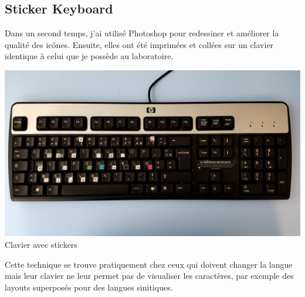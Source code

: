 \documentclass[12pt,a4paper]{article}
\begin{document}
\subsection{Sticker Keyboard}
Dans un second temps, j'ai utilisé Photoshop pour redessiner et améliorer la qualité des icônes. Ensuite, elles ont été imprimées et collées sur un clavier identique à celui que je possède au laboratoire.
\begin{center}
	\includegraphics[width=1\linewidth]{20180723_124229.jpg}
	Clavier avec stickers
\end{center}

Cette technique se trouve pratiquement chez ceux qui doivent changer la langue mais leur clavier ne leur permet pas de visualiser les caractères, par exemple des layouts superposés pour des langues sinitiques.
\end{document}
